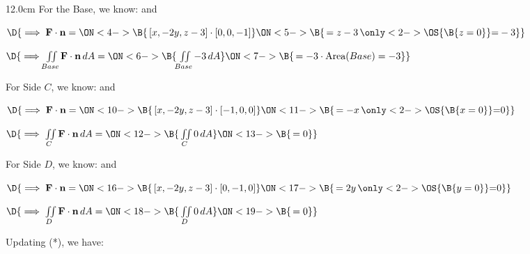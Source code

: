 \begin{frame}
\begin{columns}\begin{column}{12.0cm}
\scriptsize
For the Base, we know: \quad 
{} \quad and \quad 
{}

\vspace{0.1cm}

$\D{\implies {\bf F} \cdot {\bf n} = 
\ON<4->{\B{ \, [x,-2y,z-3] \cdot [0,0,-1]}}
\ON<5->{\B{\, = z - 3 \,\only<2->{\OS{\B{ z=0 }}}{ = } -3}}}$ 

\vspace{0.2cm}

$\D{\implies \iint \limits_{Base} {\bf F} \cdot {\bf n}\, dA = 
\ON<6->{\B{\, \iint \limits_{Base} -3 \, dA }}
\ON<7->{\B{\, = -3 \cdot \text{Area}(Base) = -3}}}$ 

\vspace{0.4cm}

For Side $C$, we know: \quad 
{} \quad and \quad 
{}

\vspace{0.1cm}

$\D{\implies {\bf F} \cdot {\bf n} = 
\ON<10->{\B{ \, [x,-2y,z-3] \cdot [-1,0,0]}}
\ON<11->{\B{\, = -x \,\only<2->{\OS{\B{ x=0 }}}{ = } 0}}}$ 

\vspace{0.2cm}

$\D{\implies \iint \limits_{C} {\bf F} \cdot {\bf n}\, dA = 
\ON<12->{\B{\, \iint \limits_{C} 0 \, dA }}
\ON<13->{\B{\, = 0}}}$

\vspace{0.4cm}

For Side $D$, we know: \quad 
{} \quad and \quad 
{}

\vspace{0.1cm}

$\D{\implies {\bf F} \cdot {\bf n} = 
\ON<16->{\B{ \, [x,-2y,z-3] \cdot [0,-1,0]}}
\ON<17->{\B{\, = 2y \,\only<2->{\OS{\B{ y=0 }}}{ = } 0}}}$ 

\vspace{0.2cm}

$\D{\implies \iint \limits_{D} {\bf F} \cdot {\bf n}\, dA = 
\ON<18->{\B{\, \iint \limits_{D} 0 \, dA }}
\ON<19->{\B{\, = 0}}}$

\vspace{0.4cm}

Updating (*), we have:


\end{column}
\end{columns}
\end{frame}
